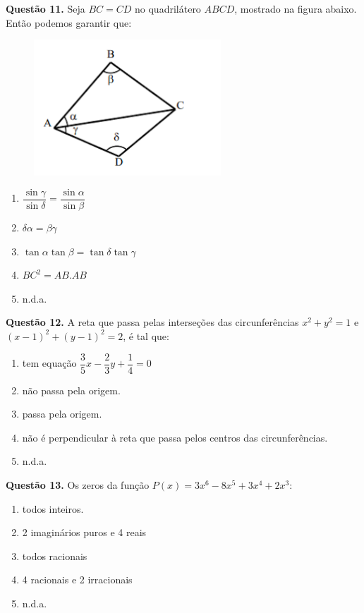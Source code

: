 \documentclass[11pt]{article}
\begin{document}
\newpage
\textbf{Questão 11.} Seja  $BC  =  CD$  no  quadrilátero  $ABCD$,  mostrado  na  figura abaixo. Então podemos garantir que: 

\begin{figure}[h]

\centering %
\includegraphics[width=7cm]{imgs/q11.png} %
\label{•}
\end{figure} 

\begin{enumerate}[\bf A (\quad)]
    \item $\dfrac{\sin \gamma}{\sin \delta} = \dfrac{\sin \alpha}{\sin \beta}$
    \item $\delta \alpha = \beta \gamma$
    \item $\tan \alpha \tan \beta = \tan \delta \tan \gamma$
    \item $BC^2 = AB. AB$
    \item n.d.a.
\end{enumerate}


\textbf{Questão 12.} A reta que passa pelas interseções das circunferências $x^2 + y^2 = 1$ e $(x - 1)^2 + (y - 1)^2 = 2$, é tal que:

\begin{enumerate}[\bf A (\quad)]
    \item  tem equação $\dfrac{3}{5}x - \dfrac{2}{3}y + \dfrac{1}{4} = 0$
    \item não passa pela origem.
    \item passa pela origem. 
    \item não é perpendicular à reta que passa pelos centros das circunferências.
    \item n.d.a.
\end{enumerate}


\textbf{Questão 13.} Os  zeros  da  função $P(x) = 3x^6 - 8x^5 + 3x^4 + 2x^3$:

\begin{enumerate}[\bf A (\quad)]
    \item todos inteiros.
    \item 2 imaginários puros e 4 reais
    \item todos racionais 
    \item 4 racionais e 2 irracionais
    \item n.d.a.
\end{enumerate}
\end{document}
